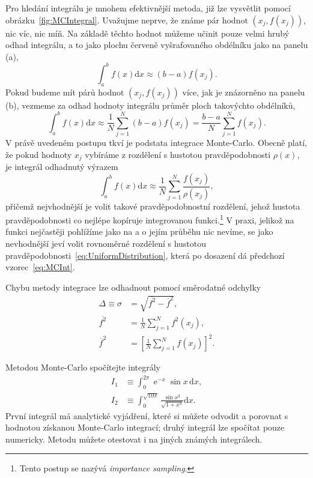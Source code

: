 \documentclass[a4paper,11pt,twoside]{article}
\DeclareMathOperator{\e}{e}
\renewcommand{\d}{\mathrm{d}}
\theoremstyle{red}
\theoremstyle{green}
\begin{document}
    Pro hledání integrálu je mnohem efektivnější metoda, již lze vysvětlit pomocí obrázku~\ref{fig:MCIntegral}.
    Uvažujme neprve, že známe pár hodnot $(x_{j},f(x_{j}))$, nic víc, nic míň.
    Na základě těchto hodnot můžeme učinit pouze velmi hrubý odhad integrálu, a to jako plochu červeně vyšrafovaného obdélníku jako na panelu (a),
    \begin{equation}
        \int_{a}^{b}f(x)\d x\approx (b-a)f(x_{j}).
    \end{equation}
    Pokud budeme mít párů hodnot $(x_{j},f(x_{j}))$ více, jak je znázorněno na panelu (b), vezmeme za odhad hodnoty integrálu průměr ploch takovýchto obdélníků,
    \begin{equation}
        \label{eq:MCInt}
        \int_{a}^{b}f(x)\d x
            \approx \frac{1}{N}\sum_{j=1}^{N}(b-a)f(x_{j})
            =\frac{b-a}{N}\sum_{j=1}^{N}f(x_{j}).
    \end{equation}
    V právě uvedeném postupu tkví je podstata integrace Monte-Carlo.
    Obecně platí, že pokud hodnoty $x_{j}$ vybíráme z rozdělení s hustotou pravděpodobnosti $\rho(x)$, je integrál odhadnutý výrazem
    \begin{equation}
        \int_{a}^{b}f(x)\d x
            \approx\frac{1}{N}\sum_{j=1}^{N}\frac{f(x_{j})}{\rho(x_{j})},
    \end{equation} 
    přičemž nejvhodnější je volit takové pravděpodobnostní rozdělení, jehož hustota pravděpodobnosti co nejlépe kopíruje integrovanou funkci.\footnote{
        Tento postup se nazývá \emph{importance sampling}.
    }
    V praxi, jelikož na funkci nejčastěji pohlížíme jako na  a o jejím průběhu nic nevíme, se jako nevhodnější jeví volit rovnoměrné rozdělení s hustotou pravděpodobnosti~\eqref{eq:UniformDistribution}, která po dosazení dá předchozí vzorec~\eqref{eq:MCInt}.

    Chybu metody integrace lze odhadnout pomocí směrodatné odchylky
    \begin{align}
        \Delta\equiv\sigma&=\sqrt{\overline{f^{2}}-\overline{f}^{2}},\\
        \overline{f^{2}}&=\frac{1}{N}\sum_{j=1}^{N}f^{2}(x_{j}),\nonumber\\
        \overline{f}^{2}&=\left[\frac{1}{N}\sum_{j=1}^{N}f(x_{j})\right]^{2}.\nonumber
    \end{align}

    \begin{task}
        Metodou Monte-Carlo spočítejte integrály
        \begin{align}
            I_{1}&\equiv\int_{0}^{2\pi}\e^{-x}\sin{x}\,\d x,
            \label{eq:I1}\\
            I_{2}&\equiv\int_{0}^{\sqrt{10\pi}}\frac{\sin{x^{2}}}{\sqrt{1+x^{4}}}\d x.
        \end{align}
        První integrál má analytické vyjádření, které si můžete odvodit a porovnat s hodnotou získanou Monte-Carlo integrací; druhý integrál lze spočítat pouze numericky.
        Metodu můžete otestovat i na jiných známých integrálech.
    \end{task}
\end{document}
